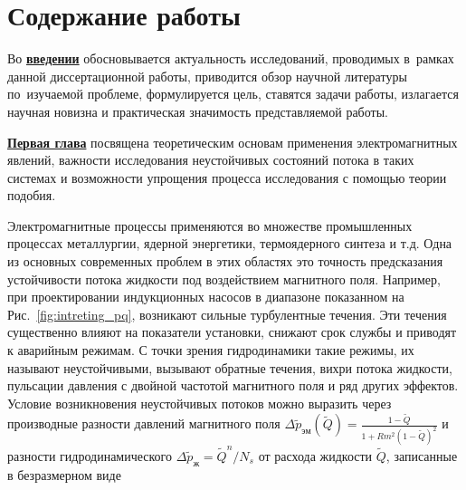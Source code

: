 \section*{Содержание работы}
Во \underline{\textbf{введении}} обосновывается актуальность
исследований, проводимых в~рамках данной диссертационной работы,
приводится обзор научной литературы по~изучаемой проблеме,
формулируется цель, ставятся задачи работы, излагается научная новизна
и практическая значимость представляемой работы.

\underline{\textbf{Первая глава}} посвящена теоретическим основам применения электромагнитных явлений, важности исследования неустойчивых состояний потока в таких системах и возможности упрощения процесса исследования с помощью теории подобия. 

Электромагнитные процессы применяются во множестве промышленных процессах металлургии, ядерной энергетики, термоядерного синтеза и т.д. Одна из основных современных проблем в этих областях это точность предсказания устойчивости потока жидкости под воздействием магнитного поля. Например, при проектировании индукционных насосов в диапазоне показанном на Рис.~\ref{fig:intreting_pq}, возникают сильные турбулентные течения. Эти течения существенно влияют на показатели установки, снижают срок службы и приводят к аварийным режимам. С точки зрения гидродинамики такие режимы, их называют неустойчивыми, вызывают обратные течения, вихри потока жидкости, пульсации давления с двойной частотой магнитного поля и ряд других эффектов. Условие возникновения неустойчивых потоков можно выразить через производные разности давлений магнитного поля $\Delta \widetilde{p}_{эм}(\widetilde{Q}) = \frac{1-\widetilde{Q}}{1+Rm^2 (1-\widetilde{Q} )^2}$  и разности гидродинамического $\Delta \widetilde{p}_{ж} = \widetilde{Q}^n / N_s $ от расхода жидкости $\widetilde{Q}$, записанные в безразмерном виде

